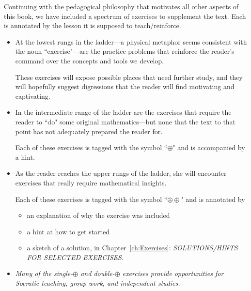 Continuing with the pedagogical philosophy that motivates all other aspects of this book, we have included a spectrum of exercises to supplement the text.  Each is annotated by the lesson it is supposed to teach/reinforce.
\begin{itemize}
\item
At the lowest rungs in the ladder---a physical metaphor seems consistent with the noun ``exercise"---are the practice problems that reinforce the reader's command over the concepts and tools we develop.

These exercises will expose possible places that need further study, and they will hopefully suggest digressions that the reader will find motivating and captivating.

\item
In the intermediate range of the ladder are the exercises that require the reader to ``do" some original mathematics---but none that the text to that point has not adequately prepared the reader for. 

Each of these exercises is tagged with the symbol ``$\oplus$" and is accompanied by a hint.

\item
As the reader reaches the upper rungs of the ladder, she will encounter exercises that really require mathematical insights.

Each of these exercises is tagged with the symbol ``$\oplus \oplus$" and is annotated by
  \begin{itemize}
  \item
an explanation of why the exercise was included
  \item
a hint at how to get started
  \item
a sketch of a solution, in Chapter~\ref{ch:Exercises}: {\it SOLUTIONS/HINTS FOR SELECTED EXERCISES}.
  \end{itemize} 

\item
{\em Many of the single-$\oplus$ and double-$\oplus$ exercises provide opportunities for Socratic teaching, group work, and independent studies.} 

\bigskip

\noindent {}
\end{itemize}

